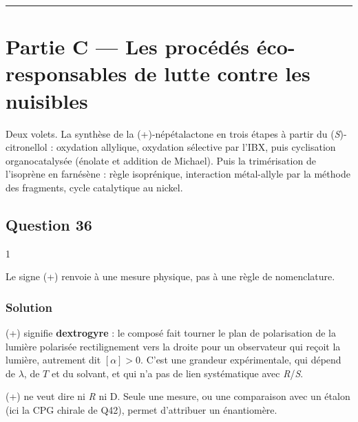 \documentclass[11pt,a4paper]{article}
\begin{document}
\begin{center}\rule{0.5\linewidth}{0.5pt}\end{center}

\hypertarget{partie-c-les-procuxe9duxe9s-uxe9co-responsables-de-lutte-contre-les-nuisibles}{%
\section{Partie C --- Les procédés éco-responsables de lutte contre les nuisibles}\label{partie-c-les-procuxe9duxe9s-uxe9co-responsables-de-lutte-contre-les-nuisibles}}

Deux volets. La synthèse de la (+)-népétalactone en trois étapes à partir du (\emph{S})-citronellol : oxydation allylique, oxydation sélective par l'IBX, puis cyclisation organocatalysée (énolate et addition de Michael). Puis la trimérisation de l'isoprène en farnésène : règle isoprénique, interaction métal-allyle par la méthode des fragments, cycle catalytique au nickel.

\hypertarget{question-36}{%
\subsection{Question 36}\label{question-36}}

\begin{indication}{1}

Le signe (+) renvoie à une mesure physique, pas à une règle de nomenclature.

\end{indication}

\hypertarget{solution-35}{%
\subsubsection{Solution}\label{solution-35}}

(+) signifie \textbf{dextrogyre} : le composé fait tourner le plan de polarisation de la lumière polarisée rectilignement vers la droite pour un observateur qui reçoit la lumière, autrement dit \([\alpha]>0\). C'est une grandeur expérimentale, qui dépend de \(\lambda\), de \(T\) et du solvant, et qui n'a pas de lien systématique avec \emph{R}/\emph{S}.

\begin{piege}

(+) ne veut dire ni \emph{R} ni D. Seule une mesure, ou une comparaison avec un étalon (ici la CPG chirale de Q42), permet d'attribuer un énantiomère.

\end{piege}
\end{document}
